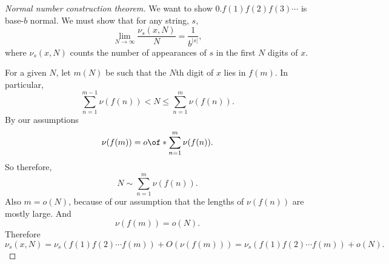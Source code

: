 \documentclass{article}
\begin{document}
\begin{proof}[Normal number construction theorem]
    We want to show $0.f(1)f(2)f(3)\cdots$ is base-$b$
    normal. We must show that for any string, $s$,
    \[\lim_{N\to\infty} \frac{\nu_s(x,N)}{N} 
    = \frac{1}{b^{|s|}},\]
    where $\nu_s(x,N)$ counts the number of appearances
    of $s$ in the first $N$ digits of $x$.

    For a given $N$, let $m(N)$ be such that the $N$th
    digit of $x$ lies in $f(m)$. In particular,
    \[
        \sum_{n=1}^{m-1} \nu(f(n)) 
        < N 
        \le 
        \sum_{n=1}^m \nu(f(n)).
    \]
    By our assumptions 
    \[
        \nu(f(m)) = o\of*{
            \sum_{n=1}^m
            \nu(f(n))
        }.
    \]
    So therefore,
    \[
        N\sim 
        \sum_{n=1}^m \nu(f(n)).
    \]
    Also $m=o(N)$, because of our assumption that 
    the lengths of $\nu(f(n))$ are mostly large.
    And 
    \[
        \nu(f(m)) = o(N).
    \]
    Therefore 
    \[
        \nu_s(x,N) = 
        \nu_s(f(1)f(2)\cdots f(m)) + O(\nu(f(m)))
        = \nu_s(f(1)f(2)\cdots f(m)) + o(N).
    \]


\end{proof}
\end{document}
